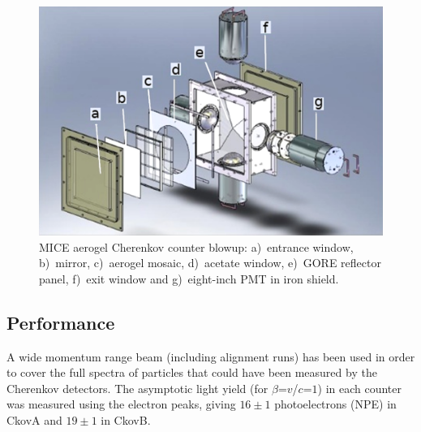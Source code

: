 \begin{figure}[htb!]
  \begin{center}
    \includegraphics[width=0.6\columnwidth]{./03-Ckov/Figures/Ckov_fix.png}
    \caption{MICE aerogel Cherenkov counter blowup: a)~entrance window, b)~mirror, c)~aerogel mosaic, d)~acetate window, e)~GORE reflector panel, f)~exit window and g)~eight-inch PMT in iron shield.}
    \label{fig:ckov1}
  \end{center}
\end{figure}

\subsection{Performance}
\label{SubSect:Ckov_Performance}

A wide momentum range beam (including alignment runs) has been used in order to cover the full spectra of particles that could have been measured by the Cherenkov detectors.
The asymptotic light yield (for $\beta$=$v$/$c$=$1$) in each counter was measured using the electron peaks, giving $16\pm1$ photoelectrons (NPE) in CkovA and $19\pm1$ in CkovB.



